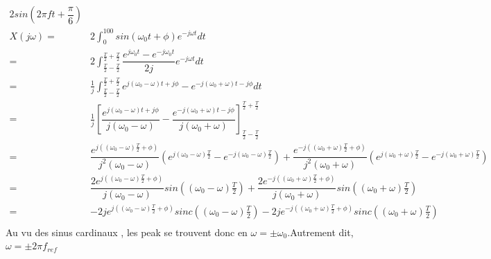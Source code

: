\documentclass[11pt,a4paper]{article}
\begin{document}
\begin{align*}
	2sin(2\pi f t + \dfrac{\pi}{6}) &                                                                                                                                                                                              \\
	X(j\omega)=                     & 2 \int_{0}^{100} sin(\omega _{0}t + \phi)e^{-j\omega t} dt                                                                                                                                    \\
	=                               & 2 \int_{\frac T2 - \frac T2} ^{\frac T2 + \frac T2} \dfrac{e^{j \omega _0 t}-e^{-j \omega _0 t}}{2j} e^{-j\omega t} dt                                                                       \\
	=                               & \frac 1j \int_{\frac T2 - \frac T2} ^{\frac T2 + \frac T2} e^{j (\omega _0 - \omega)t+j\phi }- e^{-j( \omega _0+ \omega)t-j\phi} dt                                                          \\
	=                               & \frac 1j \left [ \dfrac{e^{j(\omega_0-\omega)t+j\phi}}{j(\omega_0-\omega)}- \dfrac{e^{-j(\omega_0+\omega)t-j\phi}}{j(\omega_0+\omega)} \right] _{\frac T2 - \frac T2} ^{\frac T2 + \frac T2} \\
	=                               & \dfrac{e^{j\left((\omega _0-\omega)\frac T2 + \phi \right)}}{j^2(\omega _0 - \omega)} \left(e^{j(\omega _0- \omega)\frac T2 } -e^{-j(\omega _0- \omega)\frac T2 } \right)
	+ \dfrac{e^{-j\left((\omega_0+\omega)\frac T2+ \phi\right)}}{j^2(\omega _0 + \omega)}\left( e^{j(\omega_0 + \omega)\frac T2 } - e^{-j(\omega_0+\omega)\frac T2}\right)                                                         \\
	=                               & \dfrac{2e^{j\left((\omega _0-\omega)\frac T2 + \phi \right)}}{j(\omega _0 - \omega)} sin\left((\omega_0-\omega)\frac T2 \right)
	+ \dfrac{2e^{-j\left((\omega_0+\omega)\frac T2+ \phi\right)}}{j(\omega _0 + \omega)}sin\left((\omega_0+\omega)\frac T2\right)                                                                                                  \\
	=                               & -2je^{j\left((\omega _0-\omega)\frac T2 + \phi \right)}sinc\left((\omega_0-\omega)\frac T2 \right)
	- 2je^{-j\left((\omega_0+\omega)\frac T2+ \phi\right)}sinc\left((\omega_0+\omega)\frac T2\right)                                                                                                                               \\
\end{align*}
Au vu des sinus cardinaux , les peak se trouvent donc en $\omega =\pm\omega_0$.Autrement dit, $\omega=\pm 2 \pi f_{ref}$
\end{document}
